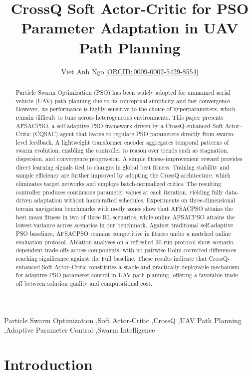 \documentclass[final,5p,times]{elsarticle}
\providecommand{\orcid}[1]{\,\href{https://orcid.org/#1}{\textcolor{ElsevierBlue}{\small[ORCID:\,#1]}}}
\begin{document}
\begin{frontmatter}
\title{CrossQ Soft Actor‑Critic for PSO Parameter Adaptation in UAV Path Planning} \author[aff1]{Viet Anh Ngo\orcid{0009-0002-5429-8554}}
\address[aff1]{School of Mechanical Engineering, Hanoi University of Science and Technology, No.~1 Dai Co Viet Road, Hai Ba Trung District, Hanoi, Vietnam} \begin{abstract}
Particle Swarm Optimization (PSO) has been widely adopted for unmanned aerial vehicle (UAV) path planning due to its conceptual simplicity and fast convergence.
However, its performance is highly sensitive to the choice of hyperparameters, which remain difficult to tune across heterogeneous environments.
This paper presents AFSACPSO, a self-adaptive PSO framework driven by a CrossQ-enhanced Soft Actor--Critic (CQSAC) agent that learns to regulate PSO parameters directly from swarm-level feedback.
A lightweight transformer encoder aggregates temporal patterns of swarm evolution, enabling the controller to reason over trends such as stagnation, dispersion, and convergence progression.
A simple fitness-improvement reward provides direct learning signals tied to changes in global best fitness.
Training stability and sample efficiency are further improved by adopting the CrossQ architecture, which eliminates target networks and employs batch-normalized critics.
The resulting controller produces continuous parameter values at each iteration, yielding fully data-driven adaptation without handcrafted schedules.
Experiments on three-dimensional terrain navigation benchmarks with no-fly zones show that AFSACPSO attains the best mean fitness in two of three RL scenarios, while online AFSACPSO attains the lowest variance across scenarios in our benchmark.
Against traditional self-adaptive PSO baselines, AFSACPSO remains competitive in fitness under a matched online evaluation protocol.
Ablation analyses on a refreshed 30-run protocol show scenario-dependent trade-offs across components, with no pairwise Holm-corrected differences reaching significance against the Full baseline.
These results indicate that CrossQ-enhanced Soft Actor--Critic constitutes a stable and practically deployable mechanism for adaptive PSO parameter control in UAV path planning, offering a favorable trade-off between solution quality and computational cost.
\end{abstract} \begin{keyword}
Particle Swarm Optimization \sep Soft Actor-Critic \sep CrossQ \sep UAV Path Planning \sep Adaptive Parameter Control \sep Swarm Intelligence
\end{keyword}
\end{frontmatter} \section{Introduction}
\end{document}
